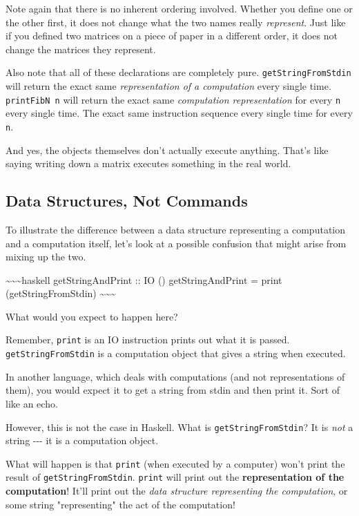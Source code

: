\documentclass[]{article}
\begin{document}
Note again that there is no inherent ordering involved. Whether you define one
or the other first, it does not change what the two names really
\emph{represent}. Just like if you defined two matrices on a piece of paper in a
different order, it does not change the matrices they represent.

Also note that all of these declarations are completely pure.
\texttt{getStringFromStdin} will return the exact same \emph{representation of a
computation} every single time. \texttt{printFibN\ n} will return the exact same
\emph{computation representation} for every \texttt{n} every single time. The
exact same instruction sequence every single time for every \texttt{n}.

And yes, the objects themselves don't actually execute anything. That's like
saying writing down a matrix executes something in the real world.

\subsection{Data Structures, Not Commands}

To illustrate the difference between a data structure representing a computation
and a computation itself, let's look at a possible confusion that might arise
from mixing up the two.

\textasciitilde{}\textasciitilde{}\textasciitilde{}haskell getStringAndPrint ::
IO () getStringAndPrint = print (getStringFromStdin)
\textasciitilde{}\textasciitilde{}\textasciitilde{}

What would you expect to happen here?

Remember, \texttt{print} is an IO instruction prints out what it is passed.
\texttt{getStringFromStdin} is a computation object that gives a string when
executed.

In another language, which deals with computations (and not representations of
them), you would expect it to get a string from stdin and then print it. Sort of
like an echo.

However, this is not the case in Haskell. What is \texttt{getStringFromStdin}?
It is \emph{not} a string -\/-\/- it is a computation object.

What will happen is that \texttt{print} (when executed by a computer) won't
print the result of \texttt{getStringFromStdin}. \texttt{print} will print out
the \textbf{representation of the computation}! It'll print out the \emph{data
structure representing the computation}, or some string "representing" the act
of the computation!
\end{document}
